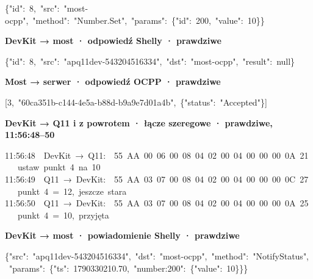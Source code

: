 \documentclass[11pt,a4paper]{article}
\begin{document}
\begin{kodbox}
\mbox{}\{"id":\ 8,\ "src":\ "most-ocpp",\ "method":\ "Number.Set",\ "params":\ \{"id":\ 200,\ "value":\ 10\}\}
\end{kodbox}

\textbf{DevKit {\symbolfont→} most · odpowiedź Shelly ·  prawdziwe}


\begin{kodbox}
\mbox{}\{"id":\ 8,\ "src":\ "apq11dev-543204516334",\ "dst":\ "most-ocpp",\ "result":\ null\}
\end{kodbox}

\textbf{Most {\symbolfont→} serwer · odpowiedź OCPP ·  prawdziwe}


\begin{kodbox}
\mbox{}[3,\ "60ca351b-c144-4e5a-b88d-b9a9e7d01a4b",\ \{"status":\ "Accepted"\}]
\end{kodbox}

\textbf{DevKit {\symbolfont→} Q11 i z powrotem · łącze szeregowe ·  prawdziwe, 11:56:48–50}


\begin{kodbox}
\mbox{}11:56:48\ \ DevKit\ {\symbolfont→}\ Q11:\ \ 55\ AA\ 00\ 06\ 00\ 08\ 04\ 02\ 00\ 04\ 00\ 00\ 00\ 0A\ 21\ \ \ ustaw\ punkt\ 4\ na\ 10\\
\mbox{}11:56:49\ \ Q11\ {\symbolfont→}\ DevKit:\ \ 55\ AA\ 03\ 07\ 00\ 08\ 04\ 02\ 00\ 04\ 00\ 00\ 00\ 0C\ 27\ \ \ punkt\ 4\ =\ 12,\ jeszcze\ stara\\
\mbox{}11:56:50\ \ Q11\ {\symbolfont→}\ DevKit:\ \ 55\ AA\ 03\ 07\ 00\ 08\ 04\ 02\ 00\ 04\ 00\ 00\ 00\ 0A\ 25\ \ \ punkt\ 4\ =\ 10,\ przyjęta
\end{kodbox}

\textbf{DevKit {\symbolfont→} most · powiadomienie Shelly ·  prawdziwe}


\begin{kodbox}
\mbox{}\{"src":\ "apq11dev-543204516334",\ "dst":\ "most-ocpp",\ "method":\ "NotifyStatus",\\
\mbox{}\ "params":\ \{"ts":\ 1790330210.70,\ "number:200":\ \{"value":\ 10\}\}\}
\end{kodbox}
\end{document}
